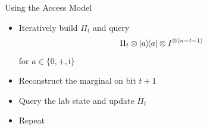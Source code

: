 \begin{frame}{Using the Access Model}
          
            \begin{itemize}
              \item Iteratively build $\Pi_t$ and query
            \[
                \Pi_t \otimes \ketbra{a}{a} \otimes I^{\otimes(n-t-1)}
            \]
            for $a\in\{0,+,\mathfrak{i}\}$

            \pause
          \item Reconstruct the marginal on bit $t+1$
            \pause
          \item Query the lab state and update $\Pi_t$
          \item Repeat
            \end{itemize}
\end{frame}
